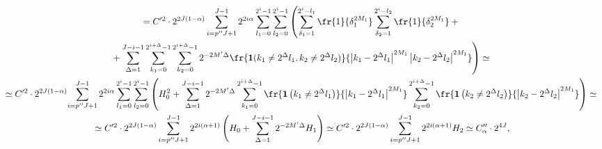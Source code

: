 \begin{multline*}


{}= C'^2 \cdot2^{2J(1-\alpha)} \sum\limits_{i = p''J + 1}^{J - 1}


2^{2i\alpha}\sum\limits_{l_1 = 0}^{2^i - 1} \sum\limits_{l_2 = 0}^{2^i - 1}


\left( \sum\limits_{\delta_1 = 1}^{2^i - l_1}


\fr{1}{\delta_1^{2M_1}}\sum\limits_{\delta_2 = 1}^{2^i - l_2} \fr{1}


{\delta_2^{2M_1}} +{}\right.\\


\left.{}+ \sum\limits_{\Delta = 1}^{J-i-1}\sum\limits_{k_1 = 0}^{2^{i+\Delta} - 1}


\sum\limits_{k_2 = 0}^{2^{i+\Delta} - 1} 2^{-2M'\Delta}


\fr{\mathbf{1}(k_1 \neq 2^{\Delta} l_1,k_2 \neq 2^{\Delta} l_2)}


{\left\vert k_1 - 2^{\Delta} l_1\right\vert^{2M_1} \left\vert k_2 - 2^{\Delta} l_2


\right\vert^{2M_1}} \right) \simeq{}


\\


{}\simeq C'^2 \cdot2^{2J(1-\alpha)} \!\sum\limits_{i = p''J + 1}^{J - 1} 2^{2i\alpha}


\sum\limits_{l_1 = 0}^{2^i - 1} \sum\limits_{l_2 = 0}^{2^i - 1} \left( H^2_0


+ \sum\limits_{\Delta = 1}^{J-i-1}2^{-2M'\Delta}


\sum\limits_{k_1 = 0}^{2^{i+\Delta} - 1}


\fr{\mathbf{1}\left(k_1 \neq 2^{\Delta} l_1\right)}


{\left\vert k_1 -2^{\Delta}l_1\right\vert^{2M_1}}


\sum\limits_{k_2 = 0}^{2^{i+\Delta} - 1} \fr{\mathbf{1}\left(k_2 \neq 2^{\Delta} l_2\right)}


{\left\vert k_2 -2^{\Delta}l_2\right\vert^{2M_1}} \right)\simeq{}\\


{}\simeq  C'^2 \cdot 2^{2J(1-\alpha)} \sum\limits_{i = p''J + 1}^{J - 1}


2^{2i(\alpha+1)} \left( H_0


+ \sum\limits_{\Delta = 1}^{J-i-1}2^{-2M'\Delta} H_1 \right)


\simeq C'^2\cdot 2^{2J(1-\alpha)}


\sum\limits_{i = p''J + 1}^{J - 1} 2^{2i(\alpha+1)} H_2


\simeq C''_\alpha \cdot 2^{4J},


\end{multline*}





